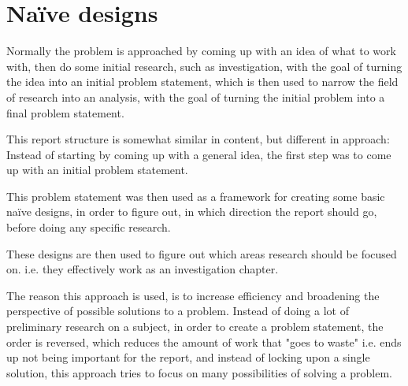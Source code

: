 \section{Naïve designs}
Normally the problem is approached by coming up with an idea of what to work with, then do some initial research, such as investigation, with the goal of turning the idea into an initial problem statement, which is then used to narrow the field of research into an analysis, with the goal of turning the initial problem into a final problem statement.

This report structure is somewhat similar in content, but different in approach:
Instead of starting by coming up with a general idea, the first step was to come up with an initial problem statement.

This problem statement was then used as a framework for creating some basic naïve designs, in order to figure out, in which direction the report should go, before doing any specific research.

These designs are then used to figure out which areas research should be focused on. i.e. they effectively work as an investigation chapter.
\bigskip

The reason this approach is used, is to increase efficiency and broadening the perspective of possible solutions to a problem. Instead of doing a lot of preliminary research on a subject, in order to create a problem statement, the order is reversed, which reduces the amount of work that "goes to waste" i.e. ends up not being important for the report, and instead of locking upon a single solution, this approach tries to focus on many possibilities of solving a problem.


